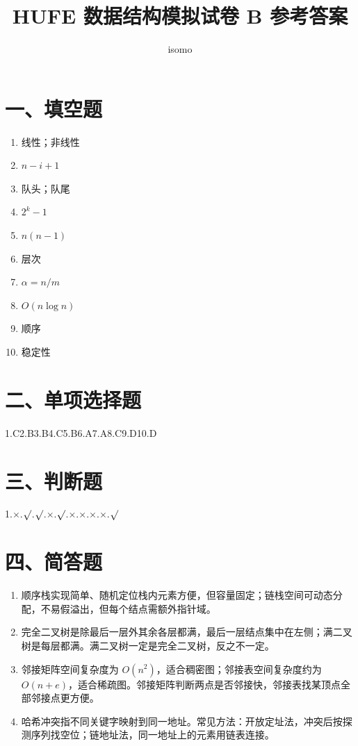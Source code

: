 \documentclass{../../note}
\title{HUFE 数据结构模拟试卷 B 参考答案}
\author{isomo}
\begin{document}
\fontsize{12pt}{14.4pt}\selectfont
\maketitle

\section*{一、填空题}

\begin{enumerate}
\item 线性；非线性
\item $n-i+1$
\item 队头；队尾
\item $2^k-1$
\item $n(n-1)$
\item 层次
\item $\alpha=n/m$
\item $O(n\log n)$
\item 顺序
\item 稳定性
\end{enumerate}

\section*{二、单项选择题}

1.C\quad 2.B\quad 3.B\quad 4.C\quad 5.B\quad 6.A\quad 7.A\quad 8.C\quad 9.D\quad 10.D

\section*{三、判断题}

1.$\times$.$\surd$.$\surd$.$\times$.$\surd$.$\times$.$\times$.$\times$.$\times$.$\surd$

\section*{四、简答题}

\begin{enumerate}[itemsep=0.8em]
\item 顺序栈实现简单、随机定位栈内元素方便，但容量固定；链栈空间可动态分配，不易假溢出，但每个结点需额外指针域。
\item 完全二叉树是除最后一层外其余各层都满，最后一层结点集中在左侧；满二叉树是每层都满。满二叉树一定是完全二叉树，反之不一定。
\item 邻接矩阵空间复杂度为 $O(n^2)$，适合稠密图；邻接表空间复杂度约为 $O(n+e)$，适合稀疏图。邻接矩阵判断两点是否邻接快，邻接表找某顶点全部邻接点更方便。
\item 哈希冲突指不同关键字映射到同一地址。常见方法：开放定址法，冲突后按探测序列找空位；链地址法，同一地址上的元素用链表连接。
\end{enumerate}
\end{document}
